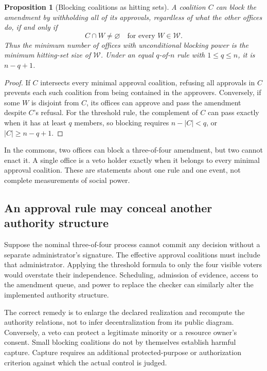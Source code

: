 \documentclass[11pt,letterpaper]{article}
\theoremstyle{plain}
\newtheorem{proposition}{Proposition}[section]
\theoremstyle{definition}
\theoremstyle{remark}
\begin{document}
\begin{proposition}[Blocking coalitions as hitting sets]\label{prop:blocker}
A coalition $C$ can block the amendment by withholding all of its approvals, regardless of what the other offices do, if and only if
\[
C\cap W\ne\varnothing\quad\text{for every }W\in\mathcal W.
\]
Thus the minimum number of offices with unconditional blocking power is the minimum hitting-set size of $\mathcal W$. Under an equal $q$-of-$n$ rule with $1\leq q\leq n$, it is $n-q+1$.
\end{proposition}
\begin{proof}
If $C$ intersects every minimal approval coalition, refusing all approvals in $C$ prevents each such coalition from being contained in the approvers. Conversely, if some $W$ is disjoint from $C$, its offices can approve and pass the amendment despite $C$'s refusal. For the threshold rule, the complement of $C$ can pass exactly when it has at least $q$ members, so blocking requires $n-|C|<q$, or $|C|\geq n-q+1$.
\end{proof}

In the commons, two offices can block a three-of-four amendment, but two cannot enact it. A single office is a veto holder exactly when it belongs to every minimal approval coalition. These are statements about one rule and one event, not complete measurements of social power.

\subsection{An approval rule may conceal another authority structure}
Suppose the nominal three-of-four process cannot commit any decision without a separate administrator's signature. The effective approval coalitions must include that administrator. Applying the threshold formula to only the four visible voters would overstate their independence. Scheduling, admission of evidence, access to the amendment queue, and power to replace the checker can similarly alter the implemented authority structure.

The correct remedy is to enlarge the declared realization and recompute the authority relations, not to infer decentralization from its public diagram. Conversely, a veto can protect a legitimate minority or a resource owner's consent. Small blocking coalitions do not by themselves establish harmful capture. Capture requires an additional protected-purpose or authorization criterion against which the actual control is judged.
\end{document}
